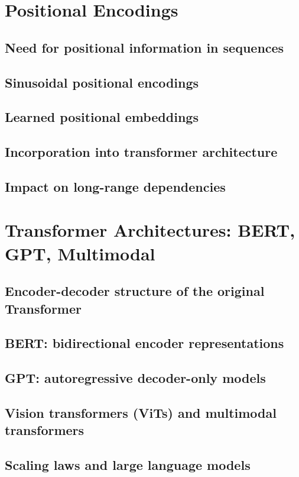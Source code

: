 \section{Positional Encodings}
\subsection{Need for positional information in sequences}
\subsection{Sinusoidal positional encodings}
\subsection{Learned positional embeddings}
\subsection{Incorporation into transformer architecture}
\subsection{Impact on long-range dependencies}

\section{Transformer Architectures: BERT, GPT, Multimodal}
\subsection{Encoder-decoder structure of the original Transformer}
\subsection{BERT: bidirectional encoder representations}
\subsection{GPT: autoregressive decoder-only models}
\subsection{Vision transformers (ViTs) and multimodal transformers}
\subsection{Scaling laws and large language models}

